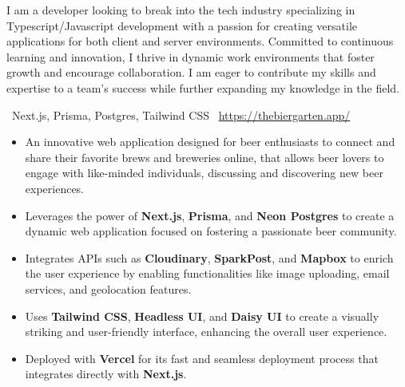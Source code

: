 \documentclass[9pt,a4paper,withhyper]{altacv}
\begin{document}

\makecvheader
{}

\begin{paracol}{2}
	I am a developer looking to break into the tech industry specializing in Typescript/Javascript development with a passion for creating versatile applications for both client and server environments. 
	\vspace{0.5em}\newline
	Committed to continuous learning and innovation, I thrive in dynamic work environments that foster growth and encourage collaboration. I am eager to contribute my skills and expertise to a team's success while further expanding my knowledge in the field.
		
	\vspace{-0.25em}
	{\small \faCode\,\,\,Next.js, Prisma, Postgres, Tailwind CSS}\newline
	{\small \faDesktop\,\,\,\url{https://thebiergarten.app/}}
			
	\vspace{0.5em}
	\begin{itemize}
		\item An innovative web application designed for beer enthusiasts to connect and share their favorite brews and breweries online, that allows beer lovers to engage with like-minded individuals, discussing and discovering new beer experiences.
		\item Leverages the power of \textbf{Next.js}, \textbf{Prisma}, and \textbf{Neon Postgres} to create a dynamic web application focused on fostering a passionate beer community.
		\item Integrates APIs such as \textbf{Cloudinary}, \textbf{SparkPost}, and \textbf{Mapbox} to enrich the user experience by enabling functionalities like image uploading, email services, and geolocation features.
		\item Uses \textbf{Tailwind CSS}, \textbf{Headless UI}, and \textbf{Daisy UI} to create a visually striking and user-friendly interface, enhancing the overall user experience.
		\item Deployed with \textbf{Vercel} for its fast and seamless deployment process that integrates directly with \textbf{Next.js}.
	\end{itemize}
			  

\end{paracol}
\end{document}

